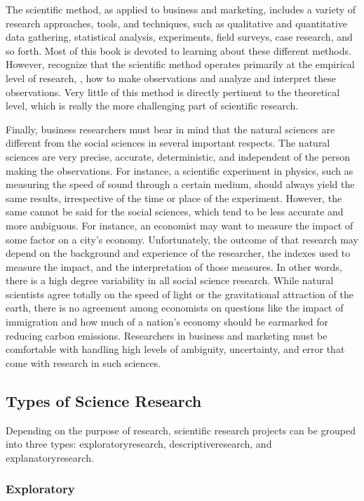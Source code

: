 The scientific method, as applied to business and marketing, includes a variety of research approaches, tools, and techniques, such as qualitative and quantitative data gathering, statistical analysis, experiments, field surveys, case research, and so forth. Most of this book is devoted to learning about these different methods. However, recognize that the scientific method operates primarily at the empirical level of research, \ie, how to make observations and analyze and interpret these observations. Very little of this method is directly pertinent to the theoretical level, which is really the more challenging part of scientific research.

Finally, business researchers must bear in mind that the natural sciences are different from the social sciences in several important respects. The natural sciences are very precise, accurate, deterministic, and independent of the person making the observations. For instance, a scientific experiment in physics, such as measuring the speed of sound through a certain medium, should always yield the same results, irrespective of the time or place of the experiment. However, the same cannot be said for the social sciences, which tend to be less accurate and more ambiguous. For instance, an economist may want to measure the impact of some factor on a city's economy. Unfortunately, the outcome of that research may depend on the background and experience of the researcher, the indexes used to measure the impact, and the interpretation of those measures. In other words, there is a high degree variability in all social science research. While natural scientists agree totally on the speed of light or the gravitational attraction of the earth, there is no agreement among economists on questions like the impact of immigration and how much of a nation's economy should be earmarked for reducing carbon emissions. Researchers in business and marketing must be comfortable with handling high levels of ambiguity, uncertainty, and error that come with research in such sciences.

\subsection{Types of Science Research}

Depending on the purpose of research, scientific research projects can be grouped into three types: \gls{exploratoryresearch}, \gls{descriptiveresearch}, and \gls{explanatoryresearch}. 

\subsubsection{Exploratory}

